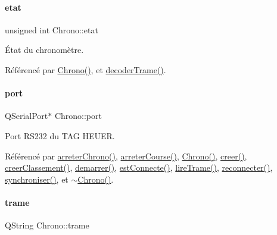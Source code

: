 \paragraph{\texorpdfstring{etat}{etat}}
{\footnotesize\ttfamily unsigned int Chrono\+::etat\hspace{0.3cm}{\ttfamily [private]}}



État du chronomètre. 



Référencé par \hyperlink{class_chrono_a01eb40847915c49c48c7dc9ca63cbd99}{Chrono()}, et \hyperlink{class_chrono_a9a66b4e81385e2c354805548b94cdfb6}{decoder\+Trame()}.

\mbox{\label{class_chrono_aca5fbe0eebd7f876f954d4a99c564167}} 
\paragraph{\texorpdfstring{port}{port}}
{\footnotesize\ttfamily Q\+Serial\+Port$\ast$ Chrono\+::port\hspace{0.3cm}{\ttfamily [private]}}



Port R\+S232 du T\+AG H\+E\+U\+ER. 



Référencé par \hyperlink{class_chrono_a5e2781ab78dcaa0ecb37e301399d819b}{arreter\+Chrono()}, \hyperlink{class_chrono_a2a0d899b09eb044caa83b41574ac5edf}{arreter\+Course()}, \hyperlink{class_chrono_a01eb40847915c49c48c7dc9ca63cbd99}{Chrono()}, \hyperlink{class_chrono_a74d85a4e856e2e59afacaa061feb7b75}{creer()}, \hyperlink{class_chrono_a0d7e3e50fcef0f2b0b7bfadc3d4f737d}{creer\+Classement()}, \hyperlink{class_chrono_a2ee875c24eb14f09011a40dfb3f1921f}{demarrer()}, \hyperlink{class_chrono_aaad6d9079f2de1c09092f97614009f62}{est\+Connecte()}, \hyperlink{class_chrono_ae7c3c8494ace02f4c9dd714f6f0e574a}{lire\+Trame()}, \hyperlink{class_chrono_a80305a5dae33e8cd99604e809589564b}{reconnecter()}, \hyperlink{class_chrono_a858a209a6d366b3adb95bcf593645d6a}{synchroniser()}, et \hyperlink{class_chrono_aaba59dd29fe5d3469c147cd2b014adc1}{$\sim$\+Chrono()}.

\mbox{\label{class_chrono_a26f2155aa6e5ef4296e5456b64a713b5}} 
\paragraph{\texorpdfstring{trame}{trame}}
{\footnotesize\ttfamily Q\+String Chrono\+::trame\hspace{0.3cm}{\ttfamily [private]}}



